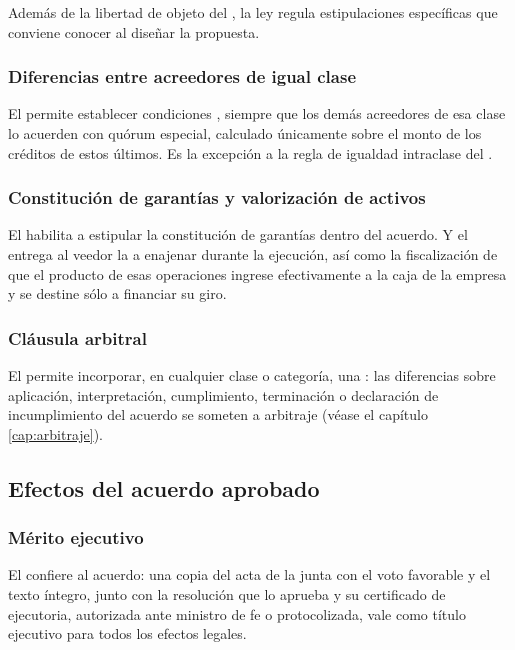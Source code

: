 Además de la libertad de objeto del , la ley regula estipulaciones específicas que
conviene conocer al diseñar la propuesta.

\subsubsection{Diferencias entre acreedores de igual clase}

El  permite establecer condiciones , siempre que los demás acreedores de esa clase lo acuerden con quórum
especial, calculado únicamente sobre el monto de los créditos de estos últimos. Es la
excepción a la regla de igualdad intraclase del .

\subsubsection{Constitución de garantías y valorización de activos}

El  habilita a estipular la constitución de garantías dentro del acuerdo. Y el
 entrega al veedor la  a enajenar durante la
ejecución, así como la fiscalización de que el producto de esas operaciones ingrese
efectivamente a la caja de la empresa y se destine sólo a financiar su giro.

\subsubsection{Cláusula arbitral}

El  permite incorporar, en cualquier clase o categoría, una : las diferencias sobre aplicación, interpretación, cumplimiento, terminación o
declaración de incumplimiento del acuerdo se someten a arbitraje (véase el capítulo
\ref{cap:arbitraje}).

\subsection{Efectos del acuerdo aprobado}

\subsubsection{Mérito ejecutivo}

El  confiere  al acuerdo: una copia del acta de la junta con
el voto favorable y el texto íntegro, junto con la resolución que lo aprueba y su certificado
de ejecutoria, autorizada ante ministro de fe o protocolizada, vale como título ejecutivo para
todos los efectos legales.

